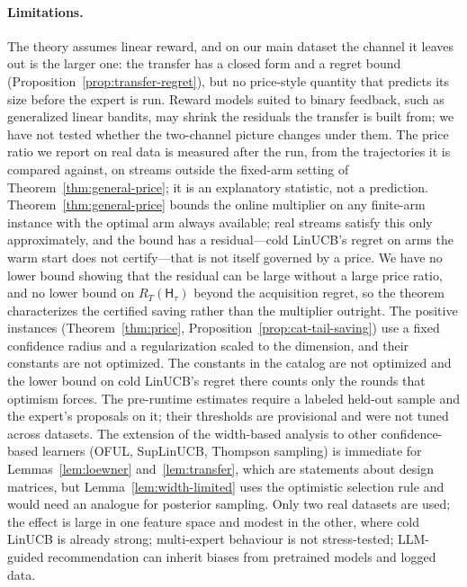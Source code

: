 \documentclass{article}
\theoremstyle{definition}
\theoremstyle{remark}
\theoremstyle{remark}
\newcommand{\Hyb}{\mathsf{H}}
\begin{document}
\paragraph{Limitations.}
The theory assumes linear reward, and on our main dataset the channel it
leaves out is the larger one: the transfer has a closed form and a regret bound
(Proposition~\ref{prop:transfer-regret}), but no price-style quantity that
predicts its size before the expert is run. Reward models suited to binary
feedback, such as generalized linear bandits, may shrink the residuals the
transfer is built from; we have not tested whether the two-channel picture
changes under them. The price ratio we report on real data is measured after
the run, from the trajectories it is compared against, on streams outside the
fixed-arm setting of Theorem~\ref{thm:general-price}; it is an explanatory
statistic, not a prediction. Theorem~\ref{thm:general-price} bounds the
online multiplier on any finite-arm instance with the optimal arm always
available; real streams satisfy this only approximately, and the bound has a
residual---cold LinUCB's regret on arms the warm start does not certify---that
is not itself governed by a price. We have no lower bound showing that the
residual can be large without a large price ratio, and no lower bound on
$R_T(\Hyb_\tau)$ beyond the acquisition regret, so the theorem characterizes
the certified saving rather than the multiplier outright. The positive
instances (Theorem~\ref{thm:price}, Proposition~\ref{prop:cat-tail-saving})
use a fixed confidence radius and a regularization scaled to the dimension,
and their constants are not optimized.
The constants in the catalog are not optimized and the lower bound on cold
LinUCB's regret there counts only the rounds that optimism forces. The pre-runtime estimates require a labeled held-out sample and the
expert's proposals on it; their thresholds are provisional and were not tuned
across datasets. The extension of the width-based analysis to other
confidence-based learners (OFUL, SupLinUCB, Thompson sampling) is immediate
for Lemmas~\ref{lem:loewner} and~\ref{lem:transfer}, which are statements
about design matrices, but Lemma~\ref{lem:width-limited} uses the optimistic
selection rule and would need an analogue for posterior sampling. Only two
real datasets are used; the effect is large in one feature space and modest in
the other, where cold LinUCB is already strong; multi-expert behaviour is not
stress-tested;
LLM-guided recommendation can inherit biases from pretrained models and
logged data.
\end{document}
